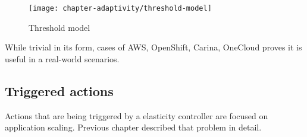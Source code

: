 \begin{figure}[!ht]
  \begin{center}
    \texttt{[image: chapter-adaptivity/threshold-model]}
  \end{center}
  \caption{Threshold model}
  \label{fig:threshold-model}
\end{figure}

While trivial in its form, cases of AWS, OpenShift, Carina, OneCloud proves it is useful in a real-world scenarios. 

\subsection{Triggered actions}
Actions that are being triggered by a elasticity controller are focused on application scaling. Previous chapter described that problem in detail.



